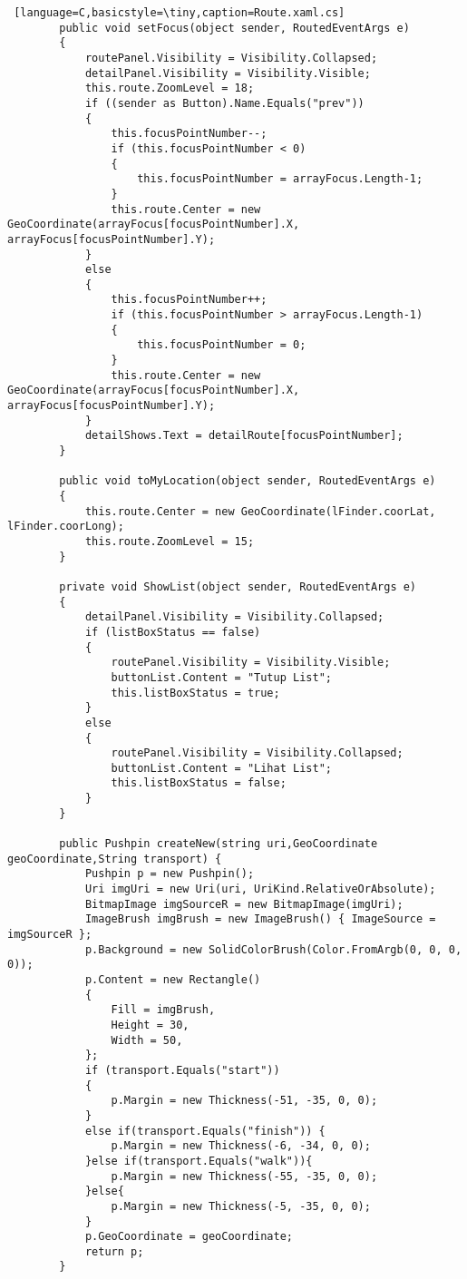 \begin{lstlisting} [language=C,basicstyle=\tiny,caption=Route.xaml.cs]
        public void setFocus(object sender, RoutedEventArgs e)
        {
            routePanel.Visibility = Visibility.Collapsed;
            detailPanel.Visibility = Visibility.Visible;
            this.route.ZoomLevel = 18;
            if ((sender as Button).Name.Equals("prev"))
            {   
                this.focusPointNumber--;
                if (this.focusPointNumber < 0)
                {
                    this.focusPointNumber = arrayFocus.Length-1;
                }
                this.route.Center = new GeoCoordinate(arrayFocus[focusPointNumber].X, arrayFocus[focusPointNumber].Y);
            }
            else 
            {
                this.focusPointNumber++;
                if (this.focusPointNumber > arrayFocus.Length-1)
                {
                    this.focusPointNumber = 0;
                }
                this.route.Center = new GeoCoordinate(arrayFocus[focusPointNumber].X, arrayFocus[focusPointNumber].Y);
            }
            detailShows.Text = detailRoute[focusPointNumber];
        }

        public void toMyLocation(object sender, RoutedEventArgs e)
        {
            this.route.Center = new GeoCoordinate(lFinder.coorLat, lFinder.coorLong);
            this.route.ZoomLevel = 15;
        }

        private void ShowList(object sender, RoutedEventArgs e)
        {
            detailPanel.Visibility = Visibility.Collapsed;
            if (listBoxStatus == false)
            {
                routePanel.Visibility = Visibility.Visible;
                buttonList.Content = "Tutup List";
                this.listBoxStatus = true;
            }
            else 
            {
                routePanel.Visibility = Visibility.Collapsed;
                buttonList.Content = "Lihat List";
                this.listBoxStatus = false;
            }
        }

        public Pushpin createNew(string uri,GeoCoordinate geoCoordinate,String transport) {
            Pushpin p = new Pushpin();
            Uri imgUri = new Uri(uri, UriKind.RelativeOrAbsolute);
            BitmapImage imgSourceR = new BitmapImage(imgUri);
            ImageBrush imgBrush = new ImageBrush() { ImageSource = imgSourceR };
            p.Background = new SolidColorBrush(Color.FromArgb(0, 0, 0, 0));
            p.Content = new Rectangle()
            {
                Fill = imgBrush,
                Height = 30,
                Width = 50,
            };
            if (transport.Equals("start"))
            {
                p.Margin = new Thickness(-51, -35, 0, 0);
            }
            else if(transport.Equals("finish")) {
                p.Margin = new Thickness(-6, -34, 0, 0);
            }else if(transport.Equals("walk")){
                p.Margin = new Thickness(-55, -35, 0, 0);
            }else{
                p.Margin = new Thickness(-5, -35, 0, 0);
            }
            p.GeoCoordinate = geoCoordinate;
            return p;
        }


\end{lstlisting}
